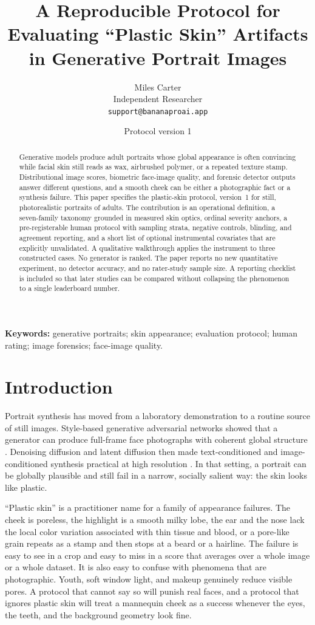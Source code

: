 \documentclass[10pt,twocolumn]{article}
\title{A Reproducible Protocol for Evaluating ``Plastic Skin'' Artifacts in Generative Portrait Images}
\author{%
  Miles Carter\\
  Independent Researcher\\
  \texttt{support@bananaproai.app}%
}
\date{Protocol version 1}
\newcommand{\prot}{plastic-skin protocol, version~1}
\begin{document}
\maketitle

\begin{abstract}
Generative models produce adult portraits whose global appearance is often convincing while facial skin still reads as wax, airbrushed polymer, or a repeated texture stamp. Distributional image scores, biometric face-image quality, and forensic detector outputs answer different questions, and a smooth cheek can be either a photographic fact or a synthesis failure. This paper specifies the \prot{} for still, photorealistic portraits of adults. The contribution is an operational definition, a seven-family taxonomy grounded in measured skin optics, ordinal severity anchors, a pre-registerable human protocol with sampling strata, negative controls, blinding, and agreement reporting, and a short list of optional instrumental covariates that are explicitly unvalidated. A qualitative walkthrough applies the instrument to three constructed cases. No generator is ranked. The paper reports no new quantitative experiment, no detector accuracy, and no rater-study sample size. A reporting checklist is included so that later studies can be compared without collapsing the phenomenon to a single leaderboard number.
\end{abstract}

\noindent\textbf{Keywords:}
generative portraits;
skin appearance;
evaluation protocol;
human rating;
image forensics;
face-image quality.

\section{Introduction}
\label{sec:intro}

Portrait synthesis has moved from a laboratory demonstration to a routine source of still images. Style-based generative adversarial networks showed that a generator can produce full-frame face photographs with coherent global structure \cite{karras2019stylegan,karras2020stylegan2}. Denoising diffusion and latent diffusion then made text-conditioned and image-conditioned synthesis practical at high resolution \cite{ho2020ddpm,rombach2022ldm,saharia2022imagen,podell2023sdxl}. In that setting, a portrait can be globally plausible and still fail in a narrow, socially salient way: the skin looks like plastic.

``Plastic skin'' is a practitioner name for a family of appearance failures. The cheek is poreless, the highlight is a smooth milky lobe, the ear and the nose lack the local color variation associated with thin tissue and blood, or a pore-like grain repeats as a stamp and then stops at a beard or a hairline. The failure is easy to see in a crop and easy to miss in a score that averages over a whole image or a whole dataset. It is also easy to confuse with phenomena that are photographic. Youth, soft window light, and makeup genuinely reduce visible pores. A protocol that cannot say so will punish real faces, and a protocol that ignores plastic skin will treat a mannequin cheek as a success whenever the eyes, the teeth, and the background geometry look fine.
\end{document}
